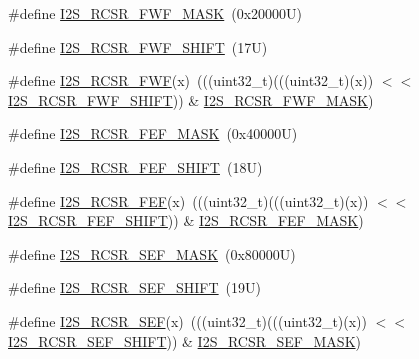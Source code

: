 \begin{DoxyCompactItemize}
\item 
\#define \mbox{\hyperlink{group___i2_s___register___masks_gaf00407ae9539455c97266c28c4ca1b14}{I2\+S\+\_\+\+R\+C\+S\+R\+\_\+\+F\+W\+F\+\_\+\+M\+A\+SK}}~(0x20000\+U)
\item 
\#define \mbox{\hyperlink{group___i2_s___register___masks_gaf6b1db4fbb777b2fea1370fc4739f6fe}{I2\+S\+\_\+\+R\+C\+S\+R\+\_\+\+F\+W\+F\+\_\+\+S\+H\+I\+FT}}~(17\+U)
\item 
\#define \mbox{\hyperlink{group___i2_s___register___masks_ga52d8f62d95d315bb25038de4db15607a}{I2\+S\+\_\+\+R\+C\+S\+R\+\_\+\+F\+WF}}(x)~(((uint32\+\_\+t)(((uint32\+\_\+t)(x)) $<$$<$ \mbox{\hyperlink{group___i2_s___register___masks_gaf6b1db4fbb777b2fea1370fc4739f6fe}{I2\+S\+\_\+\+R\+C\+S\+R\+\_\+\+F\+W\+F\+\_\+\+S\+H\+I\+FT}})) \& \mbox{\hyperlink{group___i2_s___register___masks_gaf00407ae9539455c97266c28c4ca1b14}{I2\+S\+\_\+\+R\+C\+S\+R\+\_\+\+F\+W\+F\+\_\+\+M\+A\+SK}})
\item 
\#define \mbox{\hyperlink{group___i2_s___register___masks_gae19cc8504d7958933dc2ad606612672f}{I2\+S\+\_\+\+R\+C\+S\+R\+\_\+\+F\+E\+F\+\_\+\+M\+A\+SK}}~(0x40000\+U)
\item 
\#define \mbox{\hyperlink{group___i2_s___register___masks_ga0ca8c449f2ef79ebd2f5f5c7ece147bf}{I2\+S\+\_\+\+R\+C\+S\+R\+\_\+\+F\+E\+F\+\_\+\+S\+H\+I\+FT}}~(18\+U)
\item 
\#define \mbox{\hyperlink{group___i2_s___register___masks_ga9c2c46e0a32f1eda43d6d874baf41932}{I2\+S\+\_\+\+R\+C\+S\+R\+\_\+\+F\+EF}}(x)~(((uint32\+\_\+t)(((uint32\+\_\+t)(x)) $<$$<$ \mbox{\hyperlink{group___i2_s___register___masks_ga0ca8c449f2ef79ebd2f5f5c7ece147bf}{I2\+S\+\_\+\+R\+C\+S\+R\+\_\+\+F\+E\+F\+\_\+\+S\+H\+I\+FT}})) \& \mbox{\hyperlink{group___i2_s___register___masks_gae19cc8504d7958933dc2ad606612672f}{I2\+S\+\_\+\+R\+C\+S\+R\+\_\+\+F\+E\+F\+\_\+\+M\+A\+SK}})
\item 
\#define \mbox{\hyperlink{group___i2_s___register___masks_gaf3c11fda39cb358eee170388ab7b7417}{I2\+S\+\_\+\+R\+C\+S\+R\+\_\+\+S\+E\+F\+\_\+\+M\+A\+SK}}~(0x80000\+U)
\item 
\#define \mbox{\hyperlink{group___i2_s___register___masks_ga70011d51385aea06b36d00242d4a65b0}{I2\+S\+\_\+\+R\+C\+S\+R\+\_\+\+S\+E\+F\+\_\+\+S\+H\+I\+FT}}~(19\+U)
\item 
\#define \mbox{\hyperlink{group___i2_s___register___masks_gac8dd3984f4ffb10689169e2e31646136}{I2\+S\+\_\+\+R\+C\+S\+R\+\_\+\+S\+EF}}(x)~(((uint32\+\_\+t)(((uint32\+\_\+t)(x)) $<$$<$ \mbox{\hyperlink{group___i2_s___register___masks_ga70011d51385aea06b36d00242d4a65b0}{I2\+S\+\_\+\+R\+C\+S\+R\+\_\+\+S\+E\+F\+\_\+\+S\+H\+I\+FT}})) \& \mbox{\hyperlink{group___i2_s___register___masks_gaf3c11fda39cb358eee170388ab7b7417}{I2\+S\+\_\+\+R\+C\+S\+R\+\_\+\+S\+E\+F\+\_\+\+M\+A\+SK}})
$$
\end{DoxyCompactItemize}
